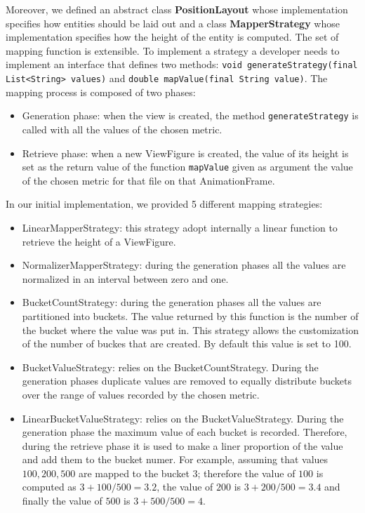 Moreover, we defined an abstract class \textbf{PositionLayout} whose implementation specifies how entities should be laid out and a class \textbf{MapperStrategy} whose implementation specifies how the height of the entity is computed. The set of mapping function is extensible. To implement a strategy a developer needs to implement an interface that defines two methods: \texttt{void generateStrategy(final List<String> values)} and \texttt{double mapValue(final String value)}. The mapping process is composed of two phases:
\begin{itemize}
    \item Generation phase: when the view is created, the method \texttt{generateStrategy} is called with all the values of the chosen metric. 
    \item Retrieve phase: when a new ViewFigure is created, the value of its height is set as the return value of the function \texttt{mapValue} given as argument the value of the chosen metric for that file on that AnimationFrame. 
\end{itemize}

In our initial implementation, we provided 5 different mapping strategies:
\begin{itemize}
    \item LinearMapperStrategy: this strategy adopt internally a linear function to retrieve the height of a ViewFigure. 
    \item NormalizerMapperStrategy: during the generation phases all the values are normalized in an interval between zero and one.

    \item BucketCountStrategy: during the generation phases all the values are partitioned into buckets. The value returned by this function is the number of the bucket where the value was put in. This strategy allows the customization of the number of buckes that are created. By default this value is set to 100. 
    \item BucketValueStrategy: relies on the BucketCountStrategy. During the generation phases duplicate values are removed to equally distribute buckets over the range of values recorded by the chosen metric. 

    \item LinearBucketValueStrategy: relies on the BucketValueStrategy. During the generation phase the maximum  value of each bucket is recorded. Therefore, during the retrieve phase it is used to make a liner proportion of the value and add them to the bucket numer. For example, assuming that values $100, 200, 500$ are mapped to the bucket $3$; therefore the value of $100$ is computed as $3 + 100/500 = 3.2$, the value of $200$ is $3 + 200/500 = 3.4$ and finally the value of $500$ is $3 + 500/500 = 4$.
\end{itemize}



